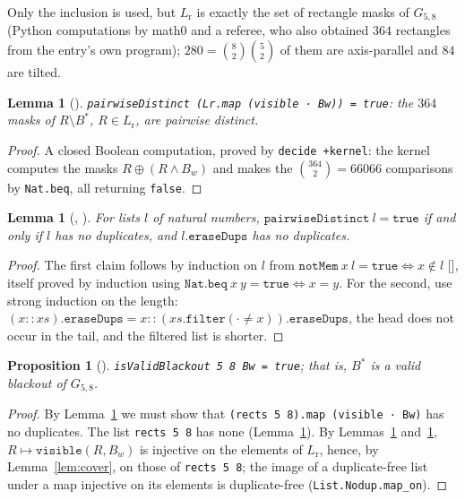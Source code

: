 \documentclass[11pt]{amsart}
\theoremstyle{plain}
\newtheorem{lemma}[theorem]{Lemma}
\newtheorem{proposition}[theorem]{Proposition}
\theoremstyle{definition}
\newcommand{\Bs}{B^{*}}
\newcommand{\Lr}{L_{\mathrm{r}}}
\begin{document}
Only the inclusion is used, but $\Lr$ is exactly the set of rectangle masks of $G_{5,8}$ (Python computations by math0 and a referee, who also obtained $364$ rectangles from the entry's own program); $280=\binom82\binom52$ of them are axis-parallel and $84$ are tilted.

\begin{lemma}[]\label{lem:dist}
\texttt{pairwiseDistinct (Lr.map (visible · Bw)) = true}: the $364$ masks of $R\setminus\Bs$, $R\in\Lr$, are pairwise distinct.
\end{lemma}

\begin{proof}
A closed Boolean computation, proved by \texttt{decide +kernel}: the kernel computes the masks $R\oplus(R\wedge B_w)$ and makes the $\binom{364}{2}=66066$ comparisons by \texttt{Nat.beq}, all returning \texttt{false}.
\end{proof}

\begin{lemma}[, ]\label{lem:pd}
For lists $l$ of natural numbers, $\texttt{pairwiseDistinct}\ l=\texttt{true}$ if and only if $l$ has no duplicates, and $l.\texttt{eraseDups}$ has no duplicates.
\end{lemma}

\begin{proof}
The first claim follows by induction on $l$ from $\texttt{notMem}\ x\ l=\texttt{true}\iff x\notin l$ [], itself proved by induction using $\texttt{Nat.beq}\ x\ y=\texttt{true}\iff x=y$. For the second, use strong induction on the length: $(x::xs).\texttt{eraseDups}=x::(xs.\texttt{filter}(\cdot\ne x)).\texttt{eraseDups}$, the head does not occur in the tail, and the filtered list is shorter.
\end{proof}

\begin{proposition}[]\label{prop:valid}
\texttt{isValidBlackout 5 8 Bw = true}; that is, $\Bs$ is a valid blackout of $G_{5,8}$.
\end{proposition}

\begin{proof}
By Lemma~\ref{lem:pd} we must show that \texttt{(rects 5 8).map (visible · Bw)} has no duplicates. The list \texttt{rects 5 8} has none (Lemma~\ref{lem:pd}). By Lemmas~\ref{lem:dist} and~\ref{lem:pd}, $R\mapsto\texttt{visible}(R,B_w)$ is injective on the elements of $\Lr$, hence, by Lemma~\ref{lem:cover}, on those of \texttt{rects 5 8}; the image of a duplicate-free list under a map injective on its elements is duplicate-free (\texttt{List.Nodup.map\_on}).
\end{proof}
\end{document}
